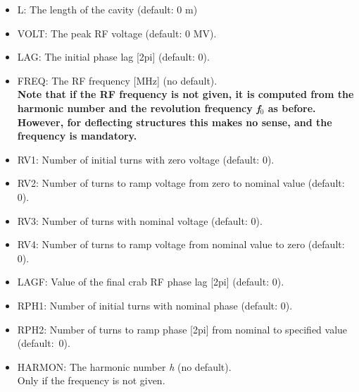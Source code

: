 \begin{itemize}
  \item L: The length of the cavity (default: 0 m) 

  \item VOLT: The peak RF voltage (default: 0 MV). 

  \item LAG: The initial phase lag [2pi] (default: 0). 

  \item FREQ: The RF frequency [MHz] (no default). \\
    {\bf Note that if the RF frequency is not given, it is computed from the
    harmonic number and the revolution frequency \textit{f$_0$} as before. 
    However, for deflecting structures this makes no sense, and the 
    frequency is mandatory.} 

  \item RV1: Number of initial turns with zero voltage (default: 0). 
  \item RV2: Number of turns to ramp voltage from zero to nominal value (default: 0). 
  \item RV3: Number of turns with nominal voltage (default: 0). 
  \item RV4: Number of turns to ramp voltage from nominal value to zero (default: 0).  

  \item LAGF: Value of the final crab RF phase lag [2pi] (default: 0).

  \item RPH1: Number of initial turns with nominal phase (default: 0). 
  \item RPH2: Number of turns to ramp phase [2pi] from nominal to
    specified value \\ (default:~0). 

  \item HARMON: The harmonic number \textit{h} (no default). \\
    Only if the frequency is not given. 

\end{itemize}


